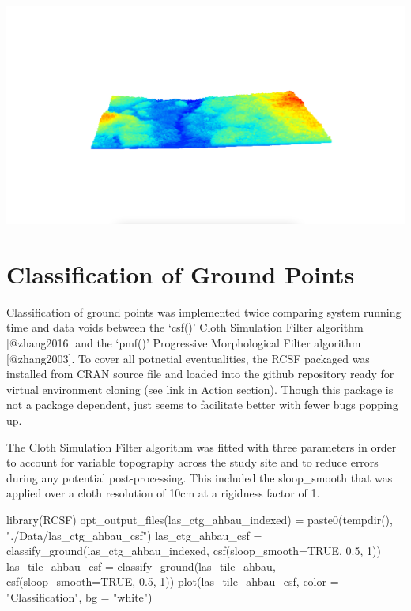 \documentclass[
]{article}
\newenvironment{Shaded}{\begin{snugshade}}{\end{snugshade}}
\newcommand{\AttributeTok}[1]{\textcolor[rgb]{0.77,0.63,0.00}{#1}}
\newcommand{\ConstantTok}[1]{\textcolor[rgb]{0.00,0.00,0.00}{#1}}
\newcommand{\DecValTok}[1]{\textcolor[rgb]{0.00,0.00,0.81}{#1}}
\newcommand{\FloatTok}[1]{\textcolor[rgb]{0.00,0.00,0.81}{#1}}
\newcommand{\FunctionTok}[1]{\textcolor[rgb]{0.00,0.00,0.00}{#1}}
\newcommand{\NormalTok}[1]{#1}
\newcommand{\OtherTok}[1]{\textcolor[rgb]{0.56,0.35,0.01}{#1}}
\newcommand{\StringTok}[1]{\textcolor[rgb]{0.31,0.60,0.02}{#1}}
\begin{document}
\includegraphics{13_lidR_PointCloud_Processing_files/markdown_pngs/las_tile_ahbau.png}

\hypertarget{classification-of-ground-points}{%
\section{Classification of Ground
Points}\label{classification-of-ground-points}}

Classification of ground points was implemented twice comparing system
running time and data voids between the `csf()' Cloth Simulation Filter
algorithm {[}@zhang2016{]} and the `pmf()' Progressive Morphological
Filter algorithm {[}@zhang2003{]}. To cover all potnetial eventualities,
the RCSF packaged was installed from CRAN source file and loaded into
the github repository ready for virtual environment cloning (see link in
Action section). Though this package is not a package dependent, just
seems to facilitate better with fewer bugs popping up.

The Cloth Simulation Filter algorithm was fitted with three parameters
in order to account for variable topography across the study site and to
reduce errors during any potential post-processing. This included the
sloop\_smooth that was applied over a cloth resolution of 10cm at a
rigidness factor of 1.

\begin{Shaded}
\begin{Highlighting}[]
\FunctionTok{library}\NormalTok{(RCSF)}
\FunctionTok{opt\_output\_files}\NormalTok{(las\_ctg\_ahbau\_indexed) }\OtherTok{=}  \FunctionTok{paste0}\NormalTok{(}\FunctionTok{tempdir}\NormalTok{(), }\StringTok{"./Data/las\_ctg\_ahbau\_csf"}\NormalTok{)}
\NormalTok{las\_ctg\_ahbau\_csf }\OtherTok{=} \FunctionTok{classify\_ground}\NormalTok{(las\_ctg\_ahbau\_indexed, }\FunctionTok{csf}\NormalTok{(}\AttributeTok{sloop\_smooth=}\ConstantTok{TRUE}\NormalTok{, }\FloatTok{0.5}\NormalTok{, }\DecValTok{1}\NormalTok{))}
\NormalTok{las\_tile\_ahbau\_csf }\OtherTok{=} \FunctionTok{classify\_ground}\NormalTok{(las\_tile\_ahbau, }\FunctionTok{csf}\NormalTok{(}\AttributeTok{sloop\_smooth=}\ConstantTok{TRUE}\NormalTok{, }\FloatTok{0.5}\NormalTok{, }\DecValTok{1}\NormalTok{))}
\FunctionTok{plot}\NormalTok{(las\_tile\_ahbau\_csf, }\AttributeTok{color =} \StringTok{"Classification"}\NormalTok{, }\AttributeTok{bg =} \StringTok{"white"}\NormalTok{) }
\end{Highlighting}
\end{Shaded}
\end{document}
